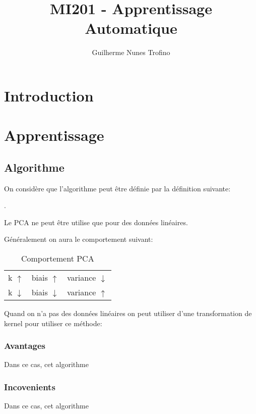\documentclass{article}
\title{MI201 - Apprentissage Automatique}
\author{Guilherme Nunes Trofino}
\begin{document}
\maketitle
\setlength{\parindent}{0pt}

\newpage\tableofcontents

\section{Introduction}


\section{Apprentissage}
\subsection{Algorithme}
On considère que l'algorithme peut être définie par la définition suivante:
\begin{definition}
    .
\end{definition}
\begin{remark}
    Le PCA ne peut être utilise que pour des données linéaires.
\end{remark}

Généralement on aura le comportement suivant:
\begin{table}[H]
    \centering\begin{tabular}{lll}
        k $\uparrow  $ & biais $\uparrow  $ & variance $\downarrow$\\
        k $\downarrow$ & biais $\downarrow$ & variance $\uparrow$\\
    \end{tabular}
    \caption{Comportement PCA}
\end{table}

Quand on n'a pas des données linéaires on peut utiliser d'une transformation de kernel pour utiliser ce méthode:
\begin{definition}
    
\end{definition} 
\subsubsection{Avantages}
Dans ce cas, cet algorithme 

\subsubsection{Incovenients}
Dans ce cas, cet algorithme 
\end{document}

